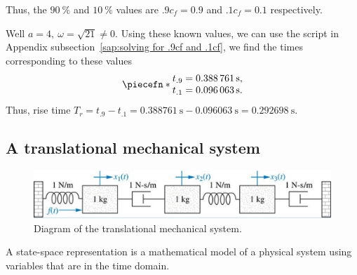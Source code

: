 \documentclass[12pt]{article}
\DeclarePairedDelimiter\piecefn\{.
\begin{document}
\begin{enumerate}
        Thus, the $\SI{90}\percent$ and $\SI{10}\percent$ values are $.9c_f = 0.9$ and $.1c_f = 0.1$ respectively.

        Well $a = 4,\ \omega = \sqrt{21} \not= 0$.
        Using these known values, we can use the script in Appendix subsection~\ref{sap:solving for .9cf and .1cf}, we find the times corresponding to these values
        \begin{equation}
            \piecefn*{
                \begin{array}{@{}l@{}}
                    t_{.9} = \SI{0.388761}\second, \\*
                    t_{.1} = \SI{0.096063}\second. \\*
                \end{array}
            }
        \end{equation}
        Thus, rise time $T_r = t_{.9} - t_{.1} = \SI{0.388761}\second - \SI{0.096063}\second = \SI{0.292698}\second$.
\end{enumerate}

\subsection{A translational mechanical system}

\begin{figure}[h]
    \centering
    \includegraphics[width=\linewidth]{part01_translational_mechanical_system.png}
    \caption{Diagram of the translational mechanical system.}
    \label{fig:translational mechanical system}
\end{figure}

A state-space representation is a mathematical model of a physical system using variables that are in the time domain.
\end{document}

